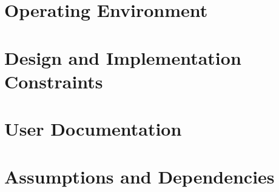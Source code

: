 \section{Operating Environment}

\section{Design and Implementation Constraints}

\section{User Documentation}

\section{Assumptions and Dependencies}

